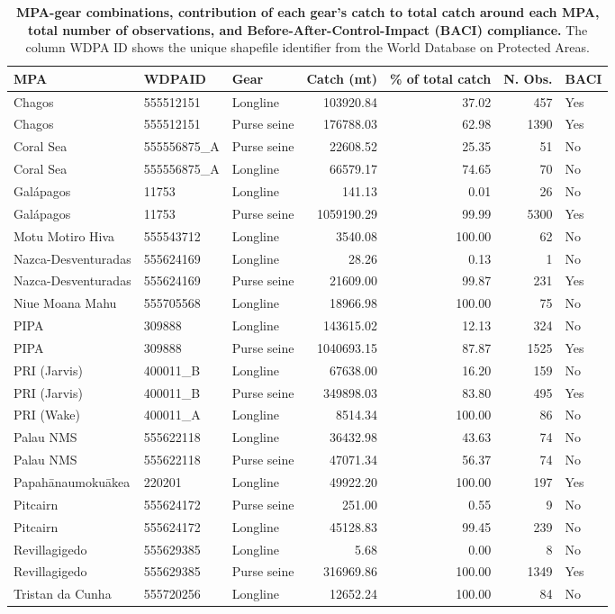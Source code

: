 \begin{table}

\caption{\label{tab:relevant_mpa_gear_combinations}\label{tab:relevant_mpa_gear_combinations}\textbf{MPA-gear combinations, contribution of each gear's catch to total catch around each MPA, total number of observations, and Before-After-Control-Impact (BACI) compliance.} The column WDPA ID shows the unique shapefile identifier from the World Database on Protected Areas.}
\centering
\begin{tabular}[t]{lllrrrl}
\toprule
MPA & WDPAID & Gear & Catch (mt) & \% of total catch & N. Obs. & BACI\\
\midrule
Chagos & 555512151 & Longline & 103920.84 & 37.02 & 457 & Yes\\
Chagos & 555512151 & Purse seine & 176788.03 & 62.98 & 1390 & Yes\\
Coral Sea & 555556875\_A & Purse seine & 22608.52 & 25.35 & 51 & No\\
Coral Sea & 555556875\_A & Longline & 66579.17 & 74.65 & 70 & No\\
Galápagos & 11753 & Longline & 141.13 & 0.01 & 26 & No\\
Galápagos & 11753 & Purse seine & 1059190.29 & 99.99 & 5300 & Yes\\
Motu Motiro Hiva & 555543712 & Longline & 3540.08 & 100.00 & 62 & No\\
Nazca-Desventuradas & 555624169 & Longline & 28.26 & 0.13 & 1 & No\\
Nazca-Desventuradas & 555624169 & Purse seine & 21609.00 & 99.87 & 231 & Yes\\
Niue Moana Mahu & 555705568 & Longline & 18966.98 & 100.00 & 75 & No\\
PIPA & 309888 & Longline & 143615.02 & 12.13 & 324 & No\\
PIPA & 309888 & Purse seine & 1040693.15 & 87.87 & 1525 & Yes\\
PRI (Jarvis) & 400011\_B & Longline & 67638.00 & 16.20 & 159 & No\\
PRI (Jarvis) & 400011\_B & Purse seine & 349898.03 & 83.80 & 495 & Yes\\
PRI (Wake) & 400011\_A & Longline & 8514.34 & 100.00 & 86 & No\\
Palau NMS & 555622118 & Longline & 36432.98 & 43.63 & 74 & No\\
Palau NMS & 555622118 & Purse seine & 47071.34 & 56.37 & 74 & No\\
Papahānaumokuākea & 220201 & Longline & 49922.20 & 100.00 & 197 & Yes\\
Pitcairn & 555624172 & Purse seine & 251.00 & 0.55 & 9 & No\\
Pitcairn & 555624172 & Longline & 45128.83 & 99.45 & 239 & No\\
Revillagigedo & 555629385 & Longline & 5.68 & 0.00 & 8 & No\\
Revillagigedo & 555629385 & Purse seine & 316969.86 & 100.00 & 1349 & Yes\\
Tristan da Cunha & 555720256 & Longline & 12652.24 & 100.00 & 84 & No\\
\bottomrule
\end{tabular}
\end{table}
